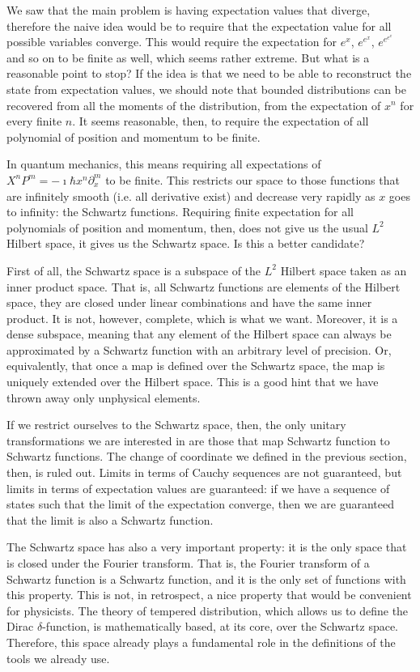 \documentclass[10pt,twocolumn, nofootinbib]{revtex4-2}
\begin{document}
We saw that the main problem is having expectation values that diverge, therefore the naive idea would be to require that the expectation value for all possible variables converge. This would require the expectation for $e^x$, $e^{e^x}$, $e^{e^{e^x}}$ and so on to be finite as well, which seems rather extreme. But what is a reasonable point to stop? If the idea is that we need to be able to reconstruct the state from expectation values, we should note that bounded distributions can be recovered from all the moments of the distribution, from the expectation of $x^n$ for every finite $n$. It seems reasonable, then, to require the expectation of all polynomial of position and momentum to be finite.

In quantum mechanics, this means requiring all expectations of $X^nP^m = -\imath \hbar x^n\partial_x ^m$ to be finite. This restricts our space to those functions that are infinitely smooth (i.e. all derivative exist) and decrease very rapidly as $x$ goes to infinity: the Schwartz functions. Requiring finite expectation for all polynomials of position and momentum, then, does not give us the usual $L^2$ Hilbert space, it gives us the Schwartz space. Is this a better candidate?

First of all, the Schwartz space is a subspace of the $L^2$ Hilbert space taken as an inner product space. That is, all Schwartz functions are elements of the Hilbert space, they are closed under linear combinations and have the same inner product. It is not, however, complete, which is what we want. Moreover, it is a dense subspace, meaning that any element of the Hilbert space can always be approximated by a Schwartz function with an arbitrary level of precision. Or, equivalently, that once a map is defined over the Schwartz space, the map is uniquely extended over the Hilbert space. This is a good hint that we have thrown away only unphysical elements.

If we restrict ourselves to the Schwartz space, then, the only unitary transformations we are interested in are those that map Schwartz function to Schwartz functions. The change of coordinate we defined in the previous section, then, is ruled out. Limits in terms of Cauchy sequences are not guaranteed, but limits in terms of expectation values are guaranteed: if we have a sequence of states such that the limit of the expectation converge, then we are guaranteed that the limit is also a Schwartz function.

The Schwartz space has also a very important property: it is the only space that is closed under the Fourier transform. That is, the Fourier transform of a Schwartz function is a Schwartz function, and it is the only set of functions with this property. This is not, in retrospect, a nice property that would be convenient for physicists. The theory of tempered distribution, which allows us to define the Dirac $\delta$-function, is mathematically based, at its core, over the Schwartz space. Therefore, this space already plays a fundamental role in the definitions of the tools we already use.
\end{document}

